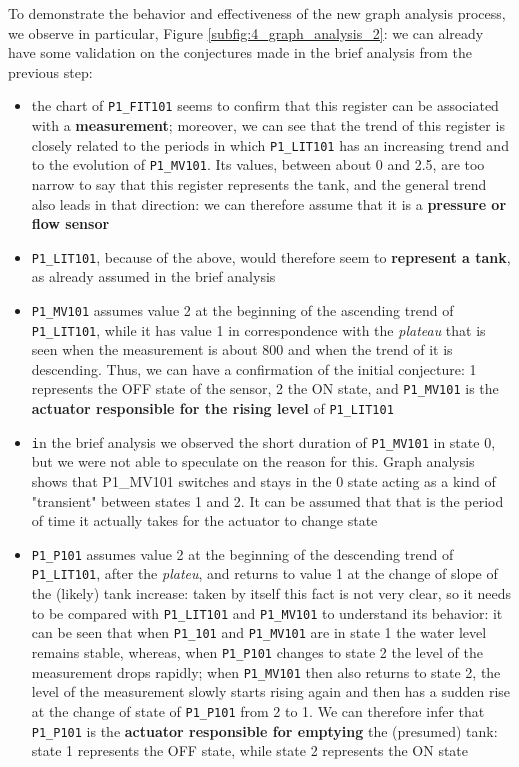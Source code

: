 \bigskip
To demonstrate the behavior and effectiveness of the new graph analysis process, we observe in particular, Figure \ref{subfig:4_graph_analysis_2}: we can already have some validation on the conjectures made in the brief analysis from the previous step:

\begin{itemize}
	\item the chart of \texttt{P1\_FIT101} seems to confirm that this register can be associated with a \textbf{measurement}; moreover, we can see that the trend of this register is closely related to the periods in which \texttt{P1\_LIT101} has an increasing trend and to the evolution of \texttt{P1\_MV101}. Its values, between about 0 and 2.5, are too narrow to say that this register represents the tank, and the general trend also leads in that direction: we can therefore assume that it is a \textbf{pressure or flow sensor}
	
	\item \texttt{P1\_LIT101}, because of the above, would therefore seem to \textbf{represent a tank}, as already assumed in the brief analysis
	
	\item \texttt{P1\_MV101} assumes value 2 at the beginning of the ascending trend of \texttt{P1\_LIT101}, while it has value 1 in correspondence with the \textit{plateau} that is seen when the measurement is about 800 and when the trend of it is descending. Thus, we can have a confirmation of the initial conjecture: 1 represents the OFF state of the sensor, 2 the ON state, and \texttt{P1\_MV101} is the \textbf{actuator responsible for the rising level} of \texttt{P1\_LIT101}
	
	\item \texttt in the brief analysis we observed the short duration of \texttt{P1\_MV101} in state 0, but we were not able to speculate on the reason for this. Graph analysis shows that {P1\_MV101} switches and stays in the 0 state acting as a kind of "transient" between states 1 and 2. It can be assumed that that is the period of time it actually takes for the actuator to change state
	
	\item \texttt{P1\_P101} assumes value 2 at the beginning of the descending trend of \texttt{P1\_LIT101}, after the \textit{plateu}, and returns to value 1 at the change of slope of the (likely) tank increase: taken by itself this fact is not very clear, so it needs to be compared with \texttt{P1\_LIT101} and \texttt{P1\_MV101} to understand its behavior: it can be seen that when \texttt{P1\_101} and \texttt{P1\_MV101} are in state 1 the water level remains stable, whereas, when \texttt{P1\_P101} changes to state 2 the level of the measurement drops rapidly; when \texttt{P1\_MV101} then also returns to state 2, the level of the measurement slowly starts rising again and then has a sudden rise at the change of state of \texttt{P1\_P101} from 2 to 1. We can therefore infer that \texttt{P1\_P101} is the \textbf{actuator responsible for emptying} the (presumed) tank: state 1 represents the OFF state, while state 2 represents the ON state
	

\end{itemize}
